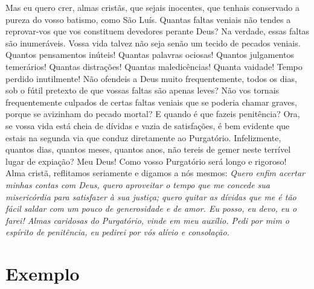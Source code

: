 Mas eu quero crer, almas cristãs, que sejais inocentes, que tenhais conservado a pureza do vosso batismo, como São Luís. Quantas faltas veniais não tendes a reprovar-vos que vos constituem devedores perante Deus? Na verdade, essas faltas são inumeráveis. Vossa vida talvez não seja senão um tecido de pecados veniais. Quantos pensamentos inúteis! Quantas palavras ociosas! Quantos julgamentos temerários! Quantas distrações! Quantas maledicências! Quanta vaidade! Tempo perdido inutilmente! Não ofendeis a Deus muito frequentemente, todos os dias, sob o fútil pretexto de que vossas faltas são apenas leves? Não vos tornais frequentemente culpados de certas faltas veniais que se poderia chamar graves, porque se avizinham do pecado mortal? E quando é que fazeis penitência? Ora, se vossa vida está cheia de dívidas e vazia de satisfações, é bem evidente que estais na segunda via que conduz diretamente ao Purgatório. Infelizmente, quantos dias, quantos meses, quantos anos, não tereis de gemer neste terrível lugar de expiação? Meu Deus! Como vosso Purgatório será longo e rigoroso! \\

Alma cristã, reflitamos seriamente e digamos a nós mesmos: \textit{Quero enfim acertar minhas contas com Deus, quero aproveitar o tempo que me concede sua misericórdia para satisfazer à sua justiça; quero quitar as dívidas que me é tão fácil saldar com um pouco de generosidade e de amor. Eu posso, eu devo, eu o farei! Almas caridosas do Purgatório, vinde em meu auxílio. Pedi por mim o espírito de penitência, eu pedirei por vós alívio e consolação.}


\section*{Exemplo }

